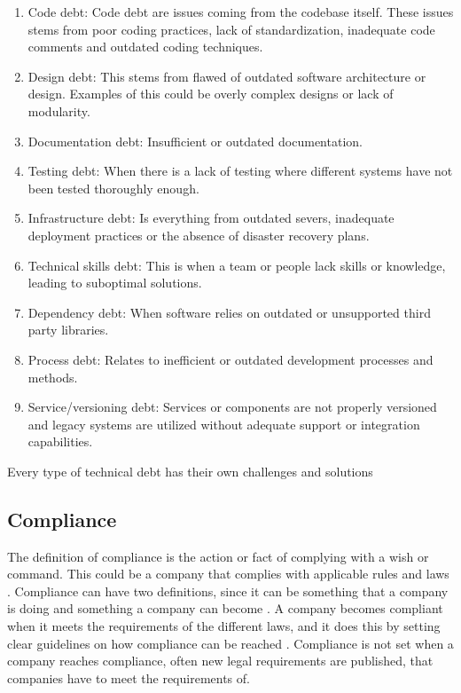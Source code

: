 \begin{enumerate}
    \item Code debt: Code debt are issues coming from the codebase itself.  These issues stems from poor coding practices, lack of standardization, inadequate code comments and outdated coding techniques. 
    \item Design debt: This stems from flawed of outdated software architecture or design. Examples of this could be overly complex designs or lack of modularity. 
    \item Documentation debt: Insufficient or outdated documentation. 
    \item Testing debt: When there is a lack of testing where different systems have not been tested thoroughly enough. 
    \item Infrastructure debt: Is everything from outdated severs, inadequate deployment practices or the absence of disaster recovery plans. 
    \item Technical skills debt: This is when a team or people lack skills or knowledge, leading to suboptimal solutions. 
    \item Dependency debt: When software relies on outdated or unsupported third party libraries.
    \item Process debt: Relates to inefficient or outdated development processes and methods. 
    \item Service/versioning debt: Services or components are not properly versioned and legacy systems are utilized without adequate support or integration capabilities. 
\end{enumerate}

Every type of technical debt has their own challenges and solutions\citep{TechinicalDebtOUTsystem}
\subsection{Compliance}
 The definition of compliance is the action or fact of complying with a wish or command. This could be a company that complies with applicable rules and laws \citep{2024compliance?}. Compliance can have two definitions, since it can be something that a company is doing and something a company can become \citep{legaldeskcompliance}. A company becomes compliant when it meets the requirements of the different laws, and it does this by setting clear guidelines on how compliance can be reached \citep{legaldeskcompliance}. Compliance is not set when a company reaches compliance, often new legal requirements are published, that companies have to meet the requirements of. 


